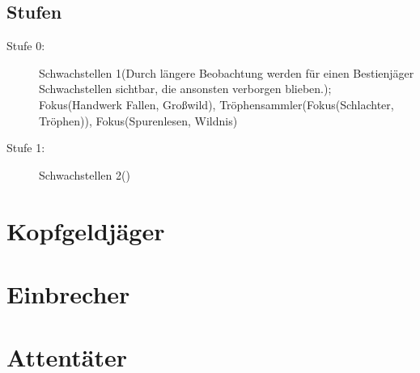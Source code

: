 \documentclass[a4paper,12pt,oneside]{book}
\begin{document}
\subsection{Stufen}
\begin{description}
\item[Stufe 0:] Schwachstellen 1(Durch längere Beobachtung werden für einen Bestienjäger Schwachstellen sichtbar, die ansonsten verborgen blieben.); Fokus(Handwerk Fallen, Großwild), Tröphensammler(Fokus(Schlachter, Tröphen)), Fokus(Spurenlesen, Wildnis)
\item[Stufe 1:] Schwachstellen 2()
\end{description}

\section{Kopfgeldjäger}

\section{Einbrecher}

\section{Attentäter}
\end{document}
